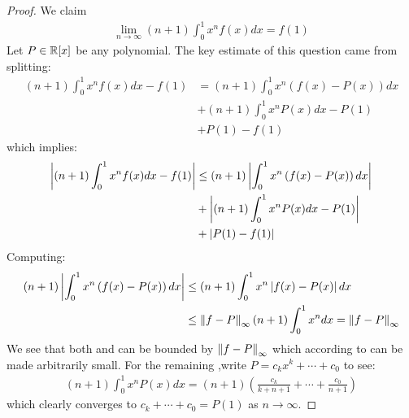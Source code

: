 \documentclass{report}
\begin{document}
\begin{proof}
We claim 
\begin{align}
\lim_{n\to \infty} (n+1) \int_0^1 x^nf(x)dx=f(1)
\end{align}
Let $P\in \mathbb{R}[x]$ be any polynomial. The key estimate of this question came from splitting: 
\begin{align*}
  (n+1)\int_0^1 x^nf(x)dx - f(1)&= (n+1) \int_0^1 x^n \left(f(x)-P(x)\right)dx \\
  &+ (n+1)\int_0^1 x^nP(x)dx -P(1) \\
  &+ P(1)-f(1)
\end{align*}
which implies: 
\begin{align}
 \label{EQpn1} \left|(n+1)\int_0^1 x^nf(x)dx-f(1)\right| &\leq  (n+1) \left|\int_0^1 x^n\left(f(x)-P(x)\right)dx\right|  \\
\label{EQpn2}  &+ \left|(n+1)\int_0^1 x^nP(x)dx-P(1)\right|\\
 \label{EQpn3} &+ \left|P(1)-f(1)\right|
\end{align}
Computing: 
\begin{align*}
  (n+1)\left|\int_0^1 x^n \left(f(x)-P(x) \right)dx\right| &\leq (n+1) \int_0^1 x^n \left|f(x)-P(x)\right|dx  \\
  &\leq \left\| f-P \right\|_{\infty} (n+1)\int_0^1 x^n dx= \left\| f-P \right\|_{\infty}
\end{align*}
We see that both  and  can be bounded by $\left\| f-P \right\|_{\infty}$ which according to  can be made arbitrarily small. For the remaining ,write $P=c_kx^k+ \cdots +c_0$ to see: 
\begin{align*}
  (n+1) \int_0^1 x^n P(x)dx= (n+1)\left( \frac{c_k}{k+n+1}+ \cdots + \frac{c_0}{n+1} \right) 
\end{align*}
which clearly converges to $c_k+\cdots + c_0=P(1)$ as $n\rightarrow  \infty $.
\end{proof}
\end{document}
